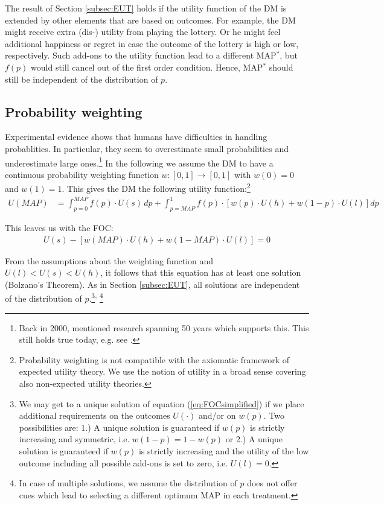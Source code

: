 \documentclass[pdftex,12pt, a4paper]{article}
\begin{document}
The result of Section \ref{subsec:EUT} holds if the utility function of the DM is extended by other elements that are based on outcomes.
For example, the DM might receive extra \mbox{(dis-)} utility from playing the lottery.
Or he might feel additional happiness or regret in case the outcome of the lottery is high or low, respectively.
Such add-ons to the utility function lead to a different MAP$^*$, but $f(p)$ would still cancel out of the first order condition.
Hence, MAP$^*$ should still be independent of the distribution of $p$.  


\subsection{Probability weighting}

Experimental evidence shows that humans have difficulties in handling probablities.
In particular, they seem to overestimate small probabilities and underestimate large ones.\footnote{
Back in 2000, \citet[p.~348--349]{Starmer2000} mentioned research spanning 50 years which supports this.
This still holds true today, e.g. see \citet[Figure 4 on p.~276]{Li2020a}.  
} 
In the following we assume the DM to have a continuous probability weighting function $w: [0,1] \rightarrow [0,1]$ with $w(0) = 0$ and $w(1) = 1$.
This gives the DM the following utility function:\footnote{
Probability weighting is not compatible with the axiomatic framework of expected utility theory.
We use the notion of utility in a broad sense covering also non-expected utility theories.
}
\begin{align}
	U(\textit{MAP}) &= \int_{p=0}^{\textit{MAP}} f(p) \cdot U(s) \, dp %
	+ \int_{p=\textit{MAP}}^1 f(p) \cdot \left[w(p) \cdot U(h) + w(1-p) \cdot U(l) \right] dp
\end{align}

This leaves us with the FOC:
\begin{align}
	\label{eq:FOCsimplified}
	U(s) - \left[w(\textit{MAP}) \cdot U(h) + w(1-\textit{MAP}) \cdot U(l) \right] = 0 
\end{align}

From the assumptions about the weighting function and $U(l)<U(s)<U(h)$, it follows that this equation has at least one solution (Bolzano's Theorem).
As in Section \ref{subsec:EUT}, all solutions are independent of the distribution of $p$.\footnote{
We may get to a unique solution of equation (\ref{eq:FOCsimplified}) if we place additional requirements on the outcomes $U(\cdot)$ and/or on $w(p)$.
Two possibilities are:
1.) A unique solution is guaranteed if $w(p)$ is strictly increasing and symmetric, i.e. $w(1-p) = 1-w(p)$ or
2.) A unique solution is guaranteed if $w(p)$ is strictly increasing and the utility of the low outcome including all possible add-ons is set to zero, i.e. $U(l) = 0$.
}\textsuperscript{,} 
\footnote{
In case of multiple solutions, we assume the distribution of $p$ does not offer cues which lead to selecting a different optimum MAP in each treatment.
}
	
\end{document}
